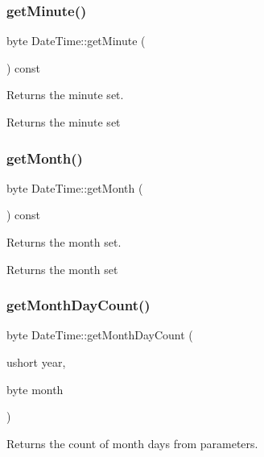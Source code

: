 \subsubsection{\texorpdfstring{getMinute()}{getMinute()}}
{\footnotesize\ttfamily byte Date\+Time\+::get\+Minute (\begin{DoxyParamCaption}{ }\end{DoxyParamCaption}) const}



Returns the minute set. 

\begin{DoxyReturn}{Returns}
the minute set 
\end{DoxyReturn}
\mbox{\label{class_date_time_a18d5987a6def22fa88302cdb50941add}} 
\subsubsection{\texorpdfstring{getMonth()}{getMonth()}}
{\footnotesize\ttfamily byte Date\+Time\+::get\+Month (\begin{DoxyParamCaption}{ }\end{DoxyParamCaption}) const}



Returns the month set. 

\begin{DoxyReturn}{Returns}
the month set 
\end{DoxyReturn}
\mbox{\label{class_date_time_a88fcd4dec4b3d77e9abdbc2bb81ed18a}} 
\subsubsection{\texorpdfstring{getMonthDayCount()}{getMonthDayCount()}}
{\footnotesize\ttfamily byte Date\+Time\+::get\+Month\+Day\+Count (\begin{DoxyParamCaption}\item[{ushort}]{year,  }\item[{byte}]{month }\end{DoxyParamCaption})}



Returns the count of month days from parameters. 


